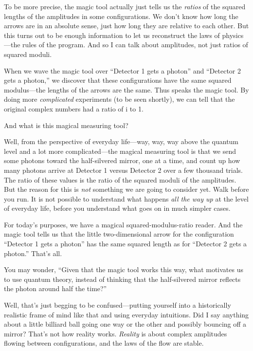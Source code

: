 {
 To be more precise, the magic tool actually just tells us the
\textit{ratios} of the squared lengths of the amplitudes in some
configurations. We don't know how long the arrows are
in an absolute sense, just how long they are relative to each other.
But this turns out to be enough information to let us reconstruct the
laws of physics---the rules of the program. And so I can talk about
amplitudes, not just ratios of squared moduli.}

{
 When we wave the magic tool over ``Detector 1
gets a photon'' and ``Detector 2
gets a photon,'' we discover that these
configurations have the same squared modulus---the lengths of the
arrows are the same. Thus speaks the magic tool. By doing more
\textit{complicated} experiments (to be seen shortly), we can tell that
the original complex numbers had a ratio of i to 1.}

{
 And what is this magical measuring tool?}

{
 Well, from the perspective of everyday life---way, way, way above
the quantum level and a lot more complicated---the magical measuring
tool is that we send some photons toward the half-silvered mirror, one
at a time, and count up how many photons arrive at Detector 1 versus
Detector 2 over a few thousand trials. The ratio of these values is the
ratio of the squared moduli of the amplitudes. But the reason for this
is \textit{not} something we are going to consider yet. Walk before you
run. It is not possible to understand what happens \textit{all the way
up} at the level of everyday life, before you understand what goes on
in much simpler cases.}

{
 For today's purposes, we have a magical
squared-modulus-ratio reader. And the magic tool tells us that the
little two-dimensional arrow for the configuration
``Detector 1 gets a photon'' has the
same squared length as for ``Detector 2 gets a
photon.'' That's all.}

{
 You may wonder, ``Given that the magic tool works
this way, what motivates us to use quantum theory, instead of thinking
that the half-silvered mirror reflects the photon around half the
time?''}

{
 Well, that's just begging to be confused---putting
yourself into a historically realistic frame of mind like that and
using everyday intuitions. Did I say anything about a little billiard
ball going one way or the other and possibly bouncing off a mirror?
That's not how reality works. \textit{Reality} is about
complex amplitudes flowing between configurations, and the laws of the
flow are stable.}

